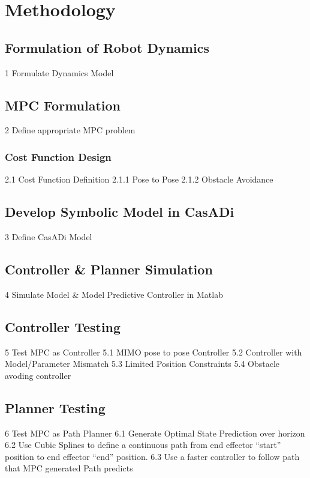 \documentclass[journal]{IEEEtran}
\begin{document}
\section{Methodology}

\subsection{Formulation of Robot Dynamics}
1 Formulate Dynamics Model

\subsection{MPC Formulation}
2 Define appropriate MPC problem

\subsubsection{Cost Function Design}

2.1 Cost Function Definition
  2.1.1 Pose to Pose
  2.1.2 Obstacle Avoidance


\subsection{Develop Symbolic Model in CasADi}
3 Define CasADi Model



\subsection{Controller \& Planner Simulation}
4 Simulate Model \& Model Predictive Controller in Matlab



\subsection{Controller Testing}

5 Test MPC as Controller
    5.1 MIMO pose to pose Controller
    5.2 Controller with Model/Parameter Mismatch
    5.3 Limited Position Constraints
    5.4 Obstacle avoding controller


\subsection{Planner Testing }

6 Test MPC as Path Planner
    6.1 Generate Optimal State Prediction over horizon
    6.2 Use Cubic Splines to define a continuous path from end effector ``start'' position to end effector ``end'' position.
    6.3 Use a faster controller to follow path that MPC generated Path predicts
\end{document}
